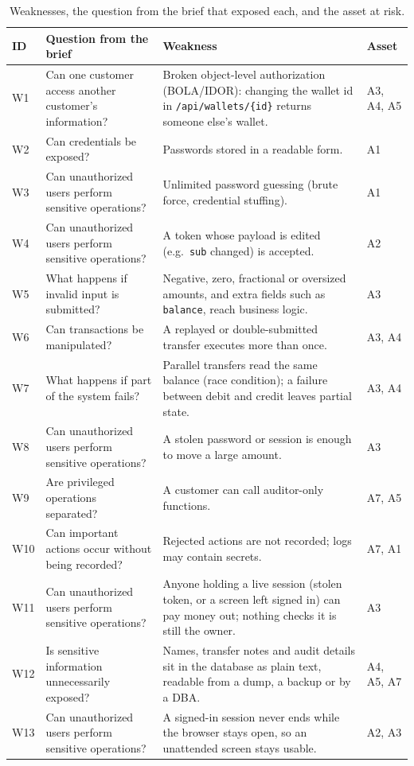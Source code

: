 \documentclass[11pt,a4paper]{article}
\newcommand{\code}[1]{\texttt{#1}}
\begin{document}
\begin{table}[H]
\centering\small
\caption{Weaknesses, the question from the brief that exposed each, and the asset at risk.}
\label{tab:weak}
\begin{tabularx}{\textwidth}{lP{4.6cm}Yl}
\toprule
ID & Question from the brief & Weakness & Asset \\
\midrule
W1 & Can one customer access another customer's information? & Broken object-level authorization (BOLA/IDOR): changing the wallet id in \code{/api/wallets/\{id\}} returns someone else's wallet. & A3, A4, A5 \\
W2 & Can credentials be exposed? & Passwords stored in a readable form. & A1 \\
W3 & Can unauthorized users perform sensitive operations? & Unlimited password guessing (brute force, credential stuffing). & A1 \\
W4 & Can unauthorized users perform sensitive operations? & A token whose payload is edited (e.g.\ \code{sub} changed) is accepted. & A2 \\
W5 & What happens if invalid input is submitted? & Negative, zero, fractional or oversized amounts, and extra fields such as \code{balance}, reach business logic. & A3 \\
W6 & Can transactions be manipulated? & A replayed or double-submitted transfer executes more than once. & A3, A4 \\
W7 & What happens if part of the system fails? & Parallel transfers read the same balance (race condition); a failure between debit and credit leaves partial state. & A3, A4 \\
W8 & Can unauthorized users perform sensitive operations? & A stolen password or session is enough to move a large amount. & A3 \\
W9 & Are privileged operations separated? & A customer can call auditor-only functions. & A7, A5 \\
W10 & Can important actions occur without being recorded? & Rejected actions are not recorded; logs may contain secrets. & A7, A1 \\
W11 & Can unauthorized users perform sensitive operations? & Anyone holding a live session (stolen token, or a screen left signed in) can pay money out; nothing checks it is still the owner. & A3 \\
W12 & Is sensitive information unnecessarily exposed? & Names, transfer notes and audit details sit in the database as plain text, readable from a dump, a backup or by a DBA. & A4, A5, A7 \\
W13 & Can unauthorized users perform sensitive operations? & A signed-in session never ends while the browser stays open, so an unattended screen stays usable. & A2, A3 \\
\bottomrule
\end{tabularx}
\end{table}
\end{document}

